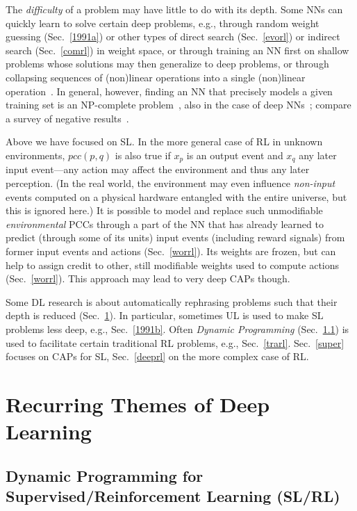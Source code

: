 \documentclass[letterpaper]{article}
\begin{document}
\begin{CJK*}{UTF8}{gbsn}
The {\em difficulty} of a problem may have little to do with its depth. 
Some NNs can quickly learn to solve certain deep problems,
e.g., through random weight guessing (Sec.~\ref{1991a})
or other types of direct search (Sec.~\ref{evorl}) or indirect search (Sec.~\ref{comrl}) in weight space,
or through training an NN first on shallow problems whose solutions may then generalize to deep problems,
or through collapsing sequences of (non)linear operations into a single (non)linear 
operation~\citep[but see an analysis of non-trivial aspects of deep linear networks,][Section B]{baldihornik95}.
In general, however, finding an NN that precisely models a given training set is an 
NP-complete problem~\citep{judd1990,blum1992},
also in the case of deep NNs~\citep{sima1994,souto1999,windisch2005};
compare a survey of negative results~\citep[Section 1]{sima2002}.


Above we have focused on SL.
In the more general case of RL in unknown environments, 
$pcc(p,q)$ is also true if $x_p$ is an output event and $x_q$ 
any later input event---any action may affect the environment and thus any later perception.
(In the real world, the environment may even influence {\em non-input} events 
computed on a physical hardware entangled with the entire universe, 
but this is ignored here.) 
It is possible to model and replace
such unmodifiable {\em environmental} PCCs
through a part of the NN that has already learned to predict (through some of its units) 
 input events (including reward signals) from
former input events and actions (Sec.~\ref{worrl}). Its weights are frozen,
but can help to assign credit to other, still modifiable weights used to compute actions (Sec.~\ref{worrl}).
This approach may lead to very deep CAPs though. 


Some DL research is about automatically rephrasing problems such that their
 depth is reduced (Sec.~\ref{themes}).
In particular,
sometimes UL is used to make SL problems less deep, e.g., Sec.~\ref{1991b}.
Often {\em Dynamic Programming} (Sec.~\ref{dp}) is used to facilitate certain traditional
RL problems, e.g., Sec.~\ref{trarl}.
Sec.~\ref{super} focuses on CAPs for
SL, Sec.~\ref{deeprl} on the more complex case of RL. 


\section{Recurring Themes of Deep Learning}
\label{themes}

\subsection{Dynamic Programming for Supervised/Reinforcement Learning (SL/RL)}
\label{dp}


\end{CJK*}
\end{document}
